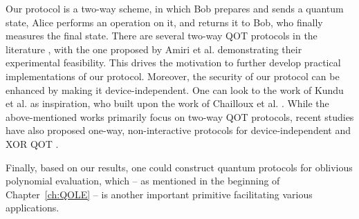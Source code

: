 Our protocol is a two-way scheme, in which Bob prepares and sends a quantum state, Alice performs an operation on it, and returns it to Bob, who finally measures the final state. There are several two-way QOT protocols in the literature \cite{CZK18, ASRP21, KST21, CKS10, CGS16}, with the one proposed by Amiri et al. \cite{ASRP21} demonstrating their experimental feasibility. This drives the motivation to further develop practical implementations of our protocol. Moreover, the security of our protocol can be enhanced by making it device-independent. One can look to the work of Kundu et al. \cite{KST21} as inspiration, who built upon the work of Chailloux et al. \cite{CKS10}. While the above-mentioned works primarily focus on two-way QOT protocols, recent studies have also proposed one-way, non-interactive protocols for device-independent \cite{BY21} and XOR QOT \cite{SSH+21}.

Finally, based on our results, one could construct quantum protocols for oblivious polynomial evaluation, which -- as mentioned in the beginning of Chapter~\ref{ch:QOLE} -- is another important primitive facilitating various applications.






%
%
%
